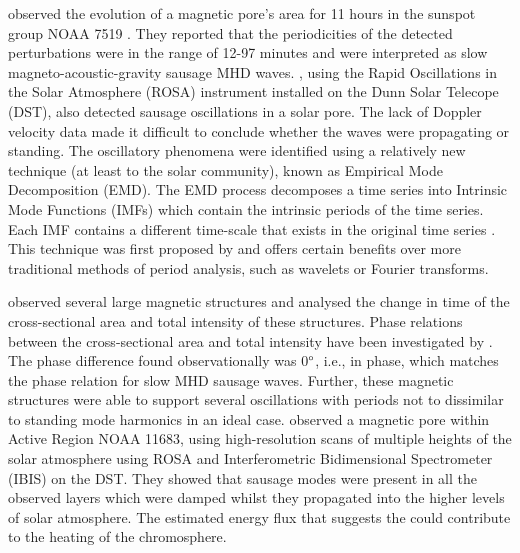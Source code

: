     \cite{doretala2008} observed the evolution of a magnetic pore's area for 11 hours in the sunspot group NOAA 7519 \citep[see][]{sobotka,doretalb}.
    They reported that the periodicities of the detected perturbations were in the range of 12-97 minutes and were interpreted as slow magneto-acoustic-gravity sausage MHD waves.
    \citet{morton2011}, using the Rapid Oscillations in the Solar Atmosphere (ROSA) instrument installed on the Dunn Solar Telecope (DST), also detected sausage oscillations in a solar pore. 
    The lack of Doppler velocity data made it difficult to conclude whether the waves were propagating or standing.
    The oscillatory phenomena were identified using a relatively new technique (at least to the solar community), known as Empirical Mode Decomposition (EMD).
    The EMD process decomposes a time series into Intrinsic Mode Functions (IMFs) which contain the intrinsic periods of the time series.
    Each IMF contains a different time-scale that exists in the original time series \citep[see][]{terradas}.
    This technique was first proposed by \citet{huang} and offers certain benefits over more traditional methods of period analysis, such as wavelets or Fourier transforms. 
    
    \cite{Dorotovic2014} observed several large magnetic structures and analysed the change in time of the cross-sectional area and total intensity of these structures.
    Phase relations between the cross-sectional area and total intensity have been investigated by \citet[e.g.,][]{Moreels2013,Moreels2013b}.
    The phase difference found observationally was 0$\degree$, i.e., in phase, which matches the phase relation for slow MHD sausage waves. 
    Further, these magnetic structures were able to support several oscillations with periods not to dissimilar to standing mode harmonics in an ideal case.    
	\cite{0004-637X-806-1-132} observed a magnetic pore within Active Region NOAA 11683, using high-resolution scans of multiple heights of the solar atmosphere using ROSA and Interferometric Bidimensional Spectrometer (IBIS) on the DST.
	They showed that sausage modes were present in all the observed layers which were damped whilst they propagated into the higher levels of solar atmosphere.
	The estimated energy flux that suggests the could contribute to the heating of the chromosphere.
    
